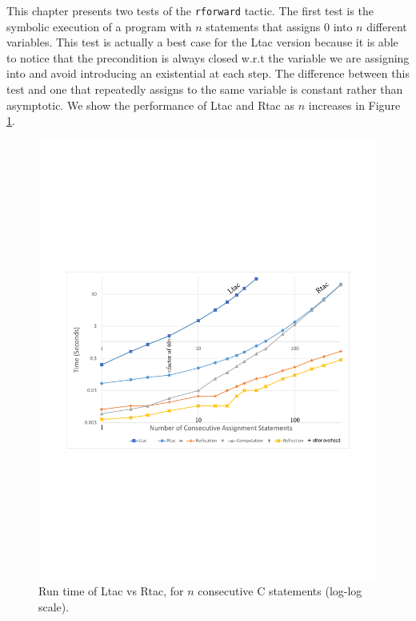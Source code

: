 \documentclass{puthesis}
\begin{document}
This chapter presents two tests of the \lstinline|rforward|
tactic. The first test is the symbolic execution of a program with
$n$ statements that assigns $0$ into $n$ different variables. This
test is actually a best case for the Ltac version because it is able
to notice that the precondition is always closed w.r.t the variable we
are assigning into and avoid introducing an existential at each
step. The difference between this test and one that repeatedly assigns
to the same variable is constant rather than asymptotic. 
We show the performance of Ltac and
Rtac as $n$ increases in Figure \ref{fig:chart}.
\begin{figure}
\vspace{-2ex}
\includegraphics[width=\textwidth]{chart.pdf}
\vspace{-4ex}
\caption{Run time of Ltac vs Rtac, for $n$ consecutive C statements (log-log scale).}
\label{fig:chart}
\vspace{-4ex}
\end{figure}
\end{document}
